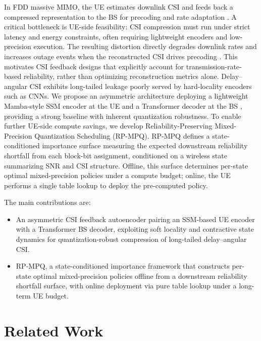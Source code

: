 \documentclass[conference]{IEEEtran}
\begin{document}
In FDD massive MIMO, the UE estimates downlink CSI and feeds back a compressed representation to the BS for precoding and rate adaptation \cite{CsiNet,CsiNetPlus,CRNet,CLNet,TransNet,ACCsiNet}.
A critical bottleneck is UE-side feasibility: CSI compression must run under strict latency and energy constraints, often requiring lightweight encoders and low-precision execution.
The resulting distortion directly degrades downlink rates and increases outage events when the reconstructed CSI drives precoding \cite{Jindal2006}.
This motivates CSI feedback designs that explicitly account for transmission-rate-based reliability, rather than optimizing reconstruction metrics alone.
Delay--angular CSI exhibits long-tailed leakage poorly served by hard-locality encoders such as CNNs.
We propose an asymmetric architecture deploying a lightweight Mamba-style SSM encoder at the UE \cite{Mamba,VMamba,MambaWireless} and a Transformer decoder at the BS \cite{TransNet}, providing a strong baseline with inherent quantization robustness.
To enable further UE-side compute savings, we develop Reliability-Preserving Mixed-Precision Quantization Scheduling (RP-MPQ).
RP-MPQ defines a state-conditioned importance surface measuring the expected downstream reliability shortfall from each block-bit assignment, conditioned on a wireless state summarizing SNR and CSI structure.
Offline, this surface determines per-state optimal mixed-precision policies under a compute budget; online, the UE performs a single table lookup to deploy the pre-computed policy.

The main contributions are:
\begin{itemize}
\item An asymmetric CSI feedback autoencoder pairing an SSM-based UE encoder with a Transformer BS decoder, exploiting soft locality and contractive state dynamics for quantization-robust compression of long-tailed delay--angular CSI.
\item RP-MPQ, a state-conditioned importance framework that constructs per-state optimal mixed-precision policies offline from a downstream reliability shortfall surface, with online deployment via pure table lookup under a long-term UE budget.
\end{itemize}

\section{Related Work}
\label{sec:related_work}
\end{document}
